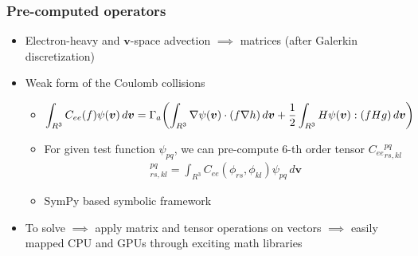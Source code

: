 \documentclass[mathserif, aspectratio=169]{beamer}
\newcommand{\vect}[1]{\boldsymbol{#1}}
\newcommand{\of}[1]{\mleft( #1 \mright)}
\newcommand{\diff}[1]{\, d#1}
\begin{document}
\begin{frame}
	\frametitle{Pre-computed operators}
	\begin{itemize}
		\item Electron-heavy and $\vect{v}$-space advection $\implies$ matrices (after Galerkin discretization)
		\item Weak form of the Coulomb collisions
		\begin{itemize}
			\item 
			\begin{align}
				\int_{R^3} C_{ee}(f) \psi(\vect{v})\diff{\vect{v}} = \Gamma_a \of{\int_{R^3} \nabla \psi\of{\vect{v}} \cdot (f \nabla h ) 	\diff{\vect{v}}  + \frac{1}{2} \int_{R^3} H\psi\of{\vect{v}} : \of{f H g} \diff{\vect{v}}} 
			\end{align}
			\item For given test function $\psi_{pq}$, we can pre-compute 6-th order tensor ${C_{ee}}_{rs,kl}^{pq}$
			\begin{align}
				[C_{ee}]_{rs,kl}^{pq} = \int_{R^3} C_{ee}(\phi_{rs}, \phi_{kl}) \psi_{pq} \diff{\vect{v}} 
			\end{align}
			\item SymPy based symbolic framework %
		\end{itemize}
		\item To solve $\implies$ apply matrix and tensor operations on vectors $\implies$ easily mapped CPU and GPUs through exciting math libraries
	\end{itemize}
\end{frame}
\end{document}
